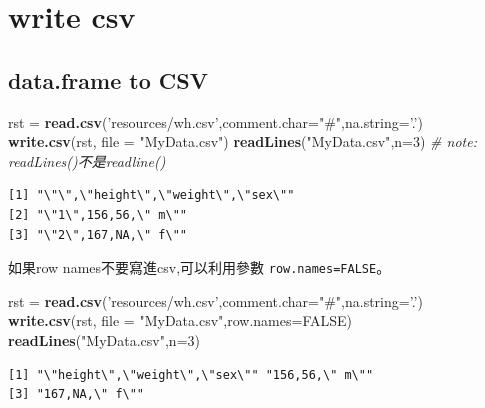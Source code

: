 \documentclass[]{book}
\newenvironment{Shaded}{\begin{snugshade}}{\end{snugshade}}
\newcommand{\CommentTok}[1]{\textcolor[rgb]{0.56,0.35,0.01}{\textit{#1}}}
\newcommand{\DataTypeTok}[1]{\textcolor[rgb]{0.13,0.29,0.53}{#1}}
\newcommand{\DecValTok}[1]{\textcolor[rgb]{0.00,0.00,0.81}{#1}}
\newcommand{\KeywordTok}[1]{\textcolor[rgb]{0.13,0.29,0.53}{\textbf{#1}}}
\newcommand{\NormalTok}[1]{#1}
\newcommand{\OtherTok}[1]{\textcolor[rgb]{0.56,0.35,0.01}{#1}}
\newcommand{\StringTok}[1]{\textcolor[rgb]{0.31,0.60,0.02}{#1}}
\theoremstyle{definition}
\theoremstyle{definition}
\theoremstyle{definition}
\theoremstyle{remark}
\begin{document}
\hypertarget{write-csv}{%
\section{write csv}\label{write-csv}}

\hypertarget{data.frame-to-csv}{%
\subsection{data.frame to CSV}\label{data.frame-to-csv}}

\begin{Shaded}
\begin{Highlighting}[]
\NormalTok{rst =}\StringTok{ }\KeywordTok{read.csv}\NormalTok{(}\StringTok{'resources/wh.csv'}\NormalTok{,}\DataTypeTok{comment.char=}\StringTok{"#"}\NormalTok{,}\DataTypeTok{na.string=}\StringTok{'.'}\NormalTok{)}
\KeywordTok{write.csv}\NormalTok{(rst, }\DataTypeTok{file =} \StringTok{"MyData.csv"}\NormalTok{)}
\KeywordTok{readLines}\NormalTok{(}\StringTok{"MyData.csv"}\NormalTok{,}\DataTypeTok{n=}\DecValTok{3}\NormalTok{) }\CommentTok{# note: readLines()不是readline() }
\end{Highlighting}
\end{Shaded}

\begin{verbatim}
[1] "\"\",\"height\",\"weight\",\"sex\""
[2] "\"1\",156,56,\" m\""               
[3] "\"2\",167,NA,\" f\""               
\end{verbatim}

如果row names不要寫進csv,可以利用參數 \texttt{row.names=FALSE}。

\begin{Shaded}
\begin{Highlighting}[]
\NormalTok{rst =}\StringTok{ }\KeywordTok{read.csv}\NormalTok{(}\StringTok{'resources/wh.csv'}\NormalTok{,}\DataTypeTok{comment.char=}\StringTok{"#"}\NormalTok{,}\DataTypeTok{na.string=}\StringTok{'.'}\NormalTok{)}
\KeywordTok{write.csv}\NormalTok{(rst, }\DataTypeTok{file =} \StringTok{"MyData.csv"}\NormalTok{,}\DataTypeTok{row.names=}\OtherTok{FALSE}\NormalTok{)}
\KeywordTok{readLines}\NormalTok{(}\StringTok{"MyData.csv"}\NormalTok{,}\DataTypeTok{n=}\DecValTok{3}\NormalTok{) }
\end{Highlighting}
\end{Shaded}

\begin{verbatim}
[1] "\"height\",\"weight\",\"sex\"" "156,56,\" m\""                
[3] "167,NA,\" f\""                
\end{verbatim}
\end{document}
